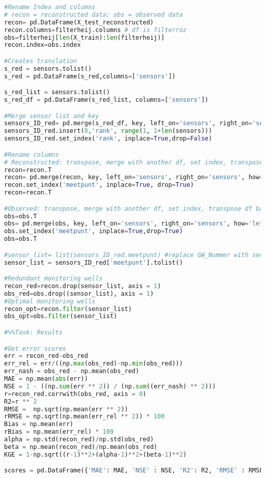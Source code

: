\begin{lstlisting}[language=Python]
#Rename Index and columns 
# recon = reconstructed data; obs = observed data
recon= pd.DataFrame(X_test_reconstructed)
recon.columns=filterheij.columns # df is filterroz 
obs=filterheij[len(X_train):len(filterheij)]
recon.index=obs.index 

#Creates translation
s_red = sensors.tolist()
s_red = pd.DataFrame(s_red,columns=['sensors'])

s_red_list = sensors.tolist()
s_red_df = pd.DataFrame(s_red_list, columns=['sensors'])

#Merge sensor list and key
sensors_ID_red= pd.merge(s_red_df, key, left_on='sensors', right_on='sensors', how='left')
sensors_ID_red.insert(0,'rank', range(1, 1+len(sensors)))
sensors_ID_red.set_index('rank', inplace=True,drop=False)

#Rename columns
# Reconstructed: transpose, merge with another df, set index, transpose df back to original. 
recon=recon.T
recon= pd.merge(recon, key, left_on='sensors', right_on='sensors', how='left')
recon.set_index('meetpunt', inplace=True, drop=True)
recon=recon.T

#Observed: transpose, merge with another df, set index, transpose df back to original. 
obs=obs.T
obs= pd.merge(obs, key, left_on='sensors', right_on='sensors', how='left')
obs.set_index('meetpunt', inplace=True,drop=True)
obs=obs.T

#sensor_list= list(sensors_ID_red.meetpunt) #replace GW_Nummer with sensor or meetpunt 
sensor_list = sensors_ID_red['meetpunt'].tolist()

#Redundant monitoring wells 
recon_red=recon.drop(sensor_list, axis = 1)
obs_red=obs.drop((sensor_list), axis = 1)
#Optimal monitoring wells 
recon_opt=recon.filter(sensor_list)
obs_opt=obs.filter(sensor_list)

#%%Task: Results 

#Get error scores
err = recon_red-obs_red
err_rel = err/((np.max(obs_red)-np.min(obs_red)))
err_nash = obs_red - np.mean(obs_red)
MAE = np.mean(abs(err))
NSE = 1 - ((np.sum(err ** 2)) / (np.sum((err_nash) ** 2)))  
r=recon_red.corrwith(obs_red, axis = 0)
R2=r ** 2
RMSE =  np.sqrt(np.mean(err ** 2))
rRMSE = np.sqrt(np.mean(err_rel ** 2)) * 100
Bias = np.mean(err)
rBias = np.mean(err_rel) * 100
alpha = np.std(recon_red)/np.std(obs_red)
beta = np.mean(recon_red)/np.mean(obs_red)
KGE = 1-np.sqrt((r-1)**2+(alpha-1)**2+(beta-1)**2)

scores = pd.DataFrame({'MAE': MAE, 'NSE' : NSE, 'R2': R2, 'RMSE' : RMSE, 'rRMSE' :  rRMSE, 'Bias' : Bias, 'rBias' : rBias, 'KGE' : KGE, 'alpha': alpha, 'beta': beta, 'r_score' :r})


\end{lstlisting}
